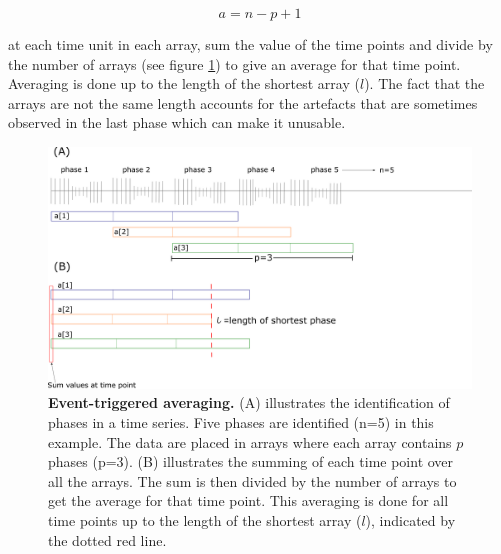 \begin{equation}
a=n-p+1
\end{equation}

at each time unit in each array, sum the value of the time points and divide by the number of arrays (see figure \ref{fig:averaging}) to give an average for that time point. Averaging is done up to the length of the shortest array ($l$).  The fact that the arrays are not the same length accounts for the artefacts that are sometimes observed in the last phase which can make it unusable. 

\begin{figure}[H]
	\begin{center}
		\includegraphics[width=\columnwidth]{graphics/averaging.png}
		\caption[Event-triggered averaging.]{\textbf{Event-triggered averaging.} (A) illustrates the identification of phases in a time series. Five phases are identified (n=5) in this example. The data are placed in arrays where each array contains $p$ phases (p=3). (B) illustrates the summing of each time point over all the arrays. The sum is then divided by the number of arrays to get the average for that time point. This averaging is done for all time points up to the length of the shortest array ($l$), indicated by the dotted red line. }
		\label{fig:averaging}
	\end{center}
\end{figure}

